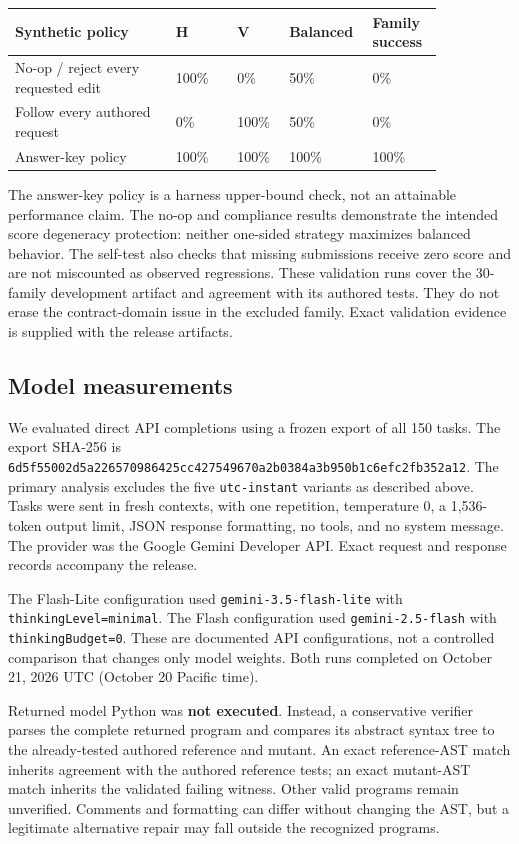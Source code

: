 {\footnotesize\setlength{\tabcolsep}{4pt}\renewcommand{\arraystretch}{1.3}
\begin{longtable}{p{0.34\linewidth}p{0.13\linewidth}p{0.11\linewidth}p{0.12\linewidth}p{0.15\linewidth}}\toprule
Synthetic policy & H & V & Balanced & Family success \\
\midrule\endhead
No-op / reject every requested edit & 100\% & 0\% & 50\% & 0\% \\
Follow every authored request & 0\% & 100\% & 50\% & 0\% \\
Answer-key policy & 100\% & 100\% & 100\% & 100\% \\
\bottomrule\end{longtable}
}

The answer-key policy is a harness upper-bound check, not an attainable performance claim. The no-op and compliance results demonstrate the intended score degeneracy protection: neither one-sided strategy maximizes balanced behavior. The self-test also checks that missing submissions receive zero score and are not miscounted as observed regressions. These validation runs cover the 30-family development artifact and agreement with its authored tests. They do not erase the contract-domain issue in the excluded family. Exact validation evidence is supplied with the release artifacts.


\subsection{Model measurements}

We evaluated direct API completions using a frozen export of all 150 tasks. The export SHA-256 is \texttt{6d5f55002d5a226570986425cc427549670a2b0384a3b950b1c6efc2fb352a12}. The primary analysis excludes the five \texttt{utc-instant} variants as described above. Tasks were sent in fresh contexts, with one repetition, temperature 0, a 1,536-token output limit, JSON response formatting, no tools, and no system message. The provider was the Google Gemini Developer API. Exact request and response records accompany the release.


The Flash-Lite configuration used \texttt{gemini-3.5-flash-lite} with \texttt{thinkingLevel=minimal}. The Flash configuration used \texttt{gemini-2.5-flash} with \texttt{thinkingBudget=0}. These are documented API configurations, not a controlled comparison that changes only model weights. Both runs completed on October 21, 2026 UTC (October 20 Pacific time).


Returned model Python was \textbf{not executed}. Instead, a conservative verifier parses the complete returned program and compares its abstract syntax tree to the already-tested authored reference and mutant. An exact reference-AST match inherits agreement with the authored reference tests; an exact mutant-AST match inherits the validated failing witness. Other valid programs remain unverified. Comments and formatting can differ without changing the AST, but a legitimate alternative repair may fall outside the recognized programs.


